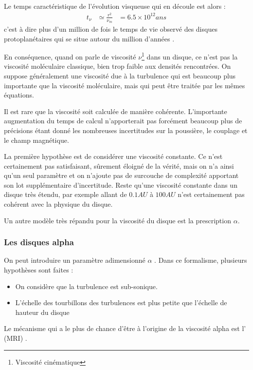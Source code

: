 Le temps caractéristique de l'évolution visqueuse qui en découle est alors : 
\begin{align}
t_\nu &\simeq \frac{r^2}{\nu_m} &= 6.5\times 10^{12}\unit{ans}
\end{align}
c'est à dire plus d'un million de fois le temps de vie observé des disques protoplanétaires qui se situe autour du million d'années \citep{williams2011protoplanetary}.

En conséquence, quand on parle de viscosité $\nu$\footnote{Viscosité cinématique} dans un disque, ce n'est pas la viscosité moléculaire classique, bien trop faible aux densités rencontrées. On suppose généralement une viscosité due à la turbulence qui est beaucoup plus importante que la viscosité moléculaire, mais qui peut être traitée par les mêmes équations. 





Il est rare que la viscosité soit calculée de manière cohérente. L'importante augmentation du temps de calcul n'apporterait pas forcément beaucoup plus de précisions étant donné les nombreuses incertitudes sur la poussière, le couplage et le champ magnétique. 

\bigskip

La première hypothèse est de considérer une viscosité constante. Ce n'est certainement pas satisfaisant, sûrement éloigné de la vérité, mais on n'a ainsi qu'un seul paramètre et on n'ajoute pas de surcouche de complexité apportant son lot supplémentaire d'incertitude. Reste qu'une viscosité constante dans un disque très étendu, par exemple allant de $0.1\unit{AU}$ à $100\unit{AU}$ n'est certainement pas cohérent avec la physique du disque. 

Un autre modèle très répandu pour la viscosité du disque est la prescription $\alpha$.


\subsubsection{Les disques alpha}\label{sec:viscosite-alpha}
On peut introduire un paramètre adimensionné $\alpha$ \citep{shakura1973black}. Dans ce formalisme, plusieurs hypothèses sont faites : 
\begin{itemize}
\item On considère que la turbulence est sub-sonique.
\item L'échelle des tourbillons des turbulences est plus petite que l'échelle de hauteur du disque
\end{itemize}
Le mécanisme qui a le plus de chance d'être à l'origine de la viscosité alpha est l' (MRI) \citep{balbus1991powerful}. 

